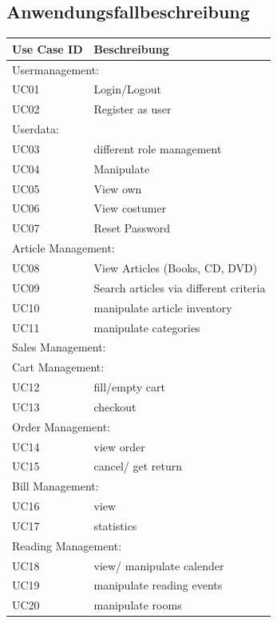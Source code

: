 \documentclass[a4paper]{article}
\begin{document}
\subsection{Anwendungsfallbeschreibung}

\begin{longtable}{|p{100px}|p{250px}|}
	\hline
	\rowcolor[HTML]{C0C0C0}
	Use Case ID & Beschreibung \\ \hline
	\multicolumn{2}{|l|}{Usermanagement:}  \\ \hline
	UC01 & Login/Logout  \\ \hline
	UC02 & Register as user  \\ \hline
	\multicolumn{2}{|l|}{Userdata:} \\ \hline
	UC03 & different role management  \\ \hline
	UC04 & Manipulate  \\ \hline
	UC05 & View own  \\ \hline
	UC06 & View costumer  \\ \hline
	UC07 & Reset Password  \\ \hline
	\multicolumn{2}{|l|}{Article Management:}  \\ \hline
	UC08 & View Articles (Books, CD, DVD)  \\ \hline
	UC09 & Search articles via different criteria  \\ \hline
	UC10 & manipulate article inventory  \\ \hline
	UC11 & manipulate categories  \\ \hline
	\multicolumn{2}{|l|}{Sales Management:}  \\ \hline
	\multicolumn{2}{|l|}{Cart Management:}  \\ \hline
	UC12 & fill/empty cart  \\ \hline
	UC13 & checkout  \\ \hline
	\multicolumn{2}{|l|}{Order Management:}  \\ \hline
	UC14 & view order  \\ \hline
	UC15 & cancel/ get return  \\ \hline
	\multicolumn{2}{|l|}{Bill Management:}  \\ \hline
	UC16 & view \\ \hline
	UC17 & statistics \\ \hline
	\multicolumn{2}{|l|}{Reading Management:} \\ \hline
	UC18 & view/ manipulate calender \\ \hline
	UC19 & manipulate reading events \\ \hline
	UC20 & manipulate rooms \\ \hline
\end{longtable}
\end{document}
